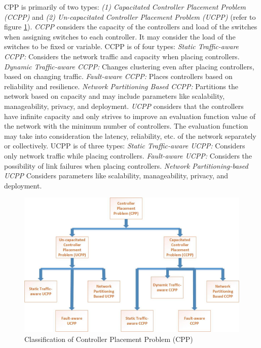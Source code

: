 \documentclass[times]{dacauth}
\begin{document}
CPP is primarily of two types\cite{cppsurvey2018}: \emph{(1) Capacitated Controller Placement Problem (CCPP)} and \emph{(2) Un-capacitated Controller Placement Problem (UCPP)} (refer to figure \ref{fig:cppclass}). \emph{CCPP} considers the capacity of the controllers and load of the switches when assigning switches to each controller. It may consider the load of the switches to be fixed or variable. CCPP is of four types: \emph{Static Traffic-aware CCPP:} Considers the network traffic and capacity when placing controllers. \emph{Dynamic Traffic-aware CCPP:} Changes clustering even after placing controllers, based on changing traffic. \emph{Fault-aware CCPP:} Places controllers based on reliability and resilience. \emph{Network Partitioning Based CCPP:} Partitions the network based on capacity and may include parameters like scalability, manageability, privacy, and deployment. \emph{UCPP} considers that the controllers have infinite capacity and only strives to improve an evaluation function value of the network with the minimum number of controllers. The evaluation function may take into consideration the latency, reliability, etc. of the network separately or collectively. UCPP is of three types: \emph{Static Traffic-aware UCPP:} Considers only network traffic while placing controllers. \emph{Fault-aware UCPP:} Considers the possibility of link failures when placing controllers. \emph{Network Partitioning-based UCPP} Considers parameters like scalability, manageability, privacy, and deployment.

\begin{figure}
	\includegraphics[width=\linewidth]{Figures/cppclassification.jpg}
	\caption{Classification of Controller Placement Problem (CPP)}
	\label{fig:cppclass}
\end{figure}
\end{document}
